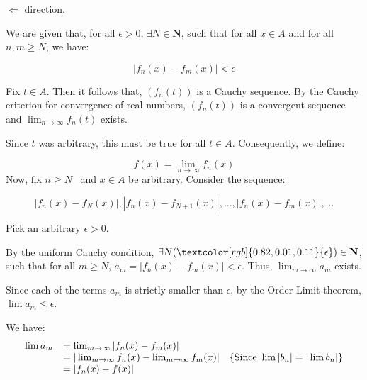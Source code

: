 \documentclass[10pt]{article}
\begin{document}
$\displaystyle \Longleftarrow $ direction. 



We are given that, for all $\displaystyle \epsilon  >0$, $\displaystyle \exists N\in \mathbf{N}$, such that for all $\displaystyle x\in A$ and for all $\displaystyle n,m\geq N$, we have:


\begin{equation*}
|f_{n}( x) -f_{m}( x) |< \epsilon 
\end{equation*}


Fix $\displaystyle t\in A$. Then it follows that, $\displaystyle ( f_{n}( t))$ is a Cauchy sequence. By the Cauchy criterion for convergence of real numbers, $\displaystyle ( f_{n}( t))$ is a convergent sequence and $\displaystyle \lim _{n\rightarrow \infty } f_{n}( t)$ exists.



Since $\displaystyle t$ was arbitrary, this must be true for all $\displaystyle t\in A$. Consequently, we define:


\begin{equation*}
f( x) =\lim _{n\rightarrow \infty } f_{n}( x)
\end{equation*}
Now, fix $\displaystyle n\geq N$ \ and $\displaystyle x\in A$ be arbitrary. Consider the sequence:


\begin{equation*}
|f_{n}( x) -f_{N}( x) |,|f_{n}( x) -f_{N+1}( x) |,\dotsc ,|f_{n}( x) -f_{m}( x) |,\dotsc 
\end{equation*}


Pick an arbitrary $\displaystyle \epsilon  >0$.



By the uniform Cauchy condition, $\displaystyle \exists N(\textcolor[rgb]{0.82,0.01,0.11}{\epsilon }) \in \mathbf{N}$, such that for all $\displaystyle m\geq N$, $\displaystyle a_{m} =|f_{n}( x) -f_{m}( x) |< \epsilon $. Thus, $\displaystyle \lim _{m\rightarrow \infty } a_{m}$ exists. 



Since each of the terms $\displaystyle a_{m}$ is strictly smaller than $\displaystyle \epsilon $, by the Order Limit theorem, $\displaystyle \lim a_{m} \leq \epsilon $. 



We have:
\begin{equation*}
\begin{array}{ c l c }
\lim a_{m} & =\lim _{m\rightarrow \infty } |f_{n}( x) -f_{m}( x) | & \\
 & =|\lim _{m\rightarrow \infty } f_{n}( x) -\lim _{m\rightarrow \infty } f_{m}( x) | & \left\{\text{Since }\lim |b_{n} |=|\lim b_{n} |\right\}\\
 & =|f_{n}( x) -f( x) | & 
\end{array}
\end{equation*}
\end{document}
